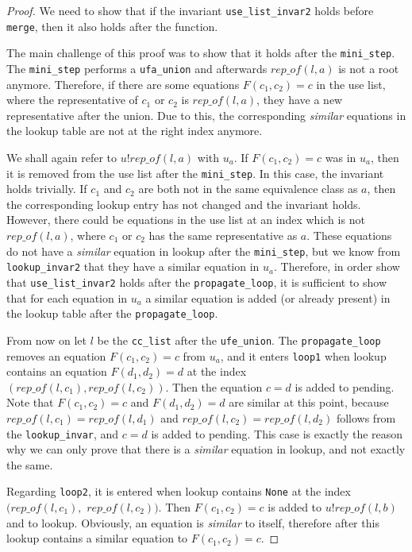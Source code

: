 \begin{proof}
We need to show that if the invariant \lstinline{use_list_invar2} holds before \lstinline{merge}, then it also holds after the function.

The main challenge of this proof was to show that it holds after the \lstinline|mini_step|.
The \lstinline|mini_step| performs a \lstinline|ufa_union| and afterwards $rep\_of(l, a)$ is not a root anymore.
Therefore, if there are some equations $F(c_1, c_2) = c$ in the use list, where the representative of $c_1$ or $c_2$ is $rep\_of(l,a)$, they have a new representative after the union. Due to this, the corresponding \emph{similar} equations in the lookup table are not at the right index anymore.

We shall again refer to $u ! rep\_of (l, a)$ with $u_a$.
If $F(c_1, c_2) = c$ was in $u_a$, then it is removed from the use list after the \lstinline|mini_step|. In this case, the invariant holds trivially.
If $c_1$ and $c_2$ are both not in the same equivalence class as $a$, then the corresponding lookup entry has not changed and the invariant holds.
However, there could be equations in the use list at an index which is not $rep\_of(l, a)$, where $c_1$ or $c_2$ has the same representative as $a$. These equations do not have a \emph{similar} equation in lookup after the \lstinline{mini_step}, but we know from \lstinline{lookup_invar2} that they have a similar equation in $u_a$.
Therefore, in order show that \lstinline{use_list_invar2} holds after the \lstinline{propagate_loop}, it is sufficient to show that for each equation in $u_a$ a similar equation is added (or already present) in the lookup table after the \lstinline{propagate_loop}.

From now on let $l$ be the \lstinline{cc_list} after the \lstinline{ufe_union}.
The \lstinline{propagate_loop} removes an equation $F(c_1, c_2) = c$ from $u_a$, and it enters \lstinline{loop1} when lookup contains an equation $F(d_1, d_2) = d$ at the index $(rep\_of(l, c_1), rep\_of(l, c_2))$.
Then the equation $c = d$ is added to pending. Note that $F(c_1, c_2) = c$ and $F(d_1, d_2) = d$ are similar at this point, because $rep\_of(l, c_1) = rep\_of(l, d_1)$ and $rep\_of(l, c_2) = rep\_of(l, d_2)$ follows from the \lstinline{lookup_invar}, and $c = d$ is added to pending.
This case is exactly the reason why we can only prove that there is a \emph{similar} equation in lookup, and not exactly the same.

Regarding \lstinline{loop2}, it is entered when lookup contains \lstinline{None} at the index
$(rep\_of(l, c_1),$ $rep\_of(l, c_2))$. Then $F(c_1, c_2) = c$ is added to $u ! rep\_of(l, b)$ and to lookup. Obviously, an equation is \emph{similar} to itself, therefore after this lookup contains a similar equation to $F(c_1, c_2) = c$.
\end{proof}

